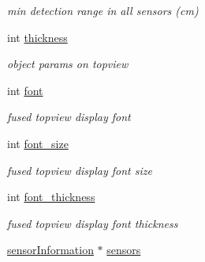 \begin{DoxyCompactItemize}
\begin{DoxyCompactList}\small\item\em min detection range in all sensors (cm) \end{DoxyCompactList}\item 
\hypertarget{class_sensor_info_a6219a61c1556e2acb5d9c0a9b32f6b02}{}int \hyperlink{class_sensor_info_a6219a61c1556e2acb5d9c0a9b32f6b02}{thickness}\label{class_sensor_info_a6219a61c1556e2acb5d9c0a9b32f6b02}

\begin{DoxyCompactList}\small\item\em object params on topview \end{DoxyCompactList}\item 
\hypertarget{class_sensor_info_a45c336a2e44db823f4a320d6ef2b4d52}{}int \hyperlink{class_sensor_info_a45c336a2e44db823f4a320d6ef2b4d52}{font}\label{class_sensor_info_a45c336a2e44db823f4a320d6ef2b4d52}

\begin{DoxyCompactList}\small\item\em fused topview display font \end{DoxyCompactList}\item 
\hypertarget{class_sensor_info_a2733e9cc3035fd40566808361c5a819f}{}int \hyperlink{class_sensor_info_a2733e9cc3035fd40566808361c5a819f}{font\+\_\+size}\label{class_sensor_info_a2733e9cc3035fd40566808361c5a819f}

\begin{DoxyCompactList}\small\item\em fused topview display font size \end{DoxyCompactList}\item 
\hypertarget{class_sensor_info_ad58b0cb318df92ad6d13f5797ba63628}{}int \hyperlink{class_sensor_info_ad58b0cb318df92ad6d13f5797ba63628}{font\+\_\+thickness}\label{class_sensor_info_ad58b0cb318df92ad6d13f5797ba63628}

\begin{DoxyCompactList}\small\item\em fused topview display font thickness \end{DoxyCompactList}\item 
\hypertarget{class_sensor_info_a720be10334cf4d6ebbae55f78410a311}{}\hyperlink{struct_sensor_info_1_1sensor_information}{sensor\+Information} $\ast$ \hyperlink{class_sensor_info_a720be10334cf4d6ebbae55f78410a311}{sensors}\label{class_sensor_info_a720be10334cf4d6ebbae55f78410a311}


\end{DoxyCompactItemize}
